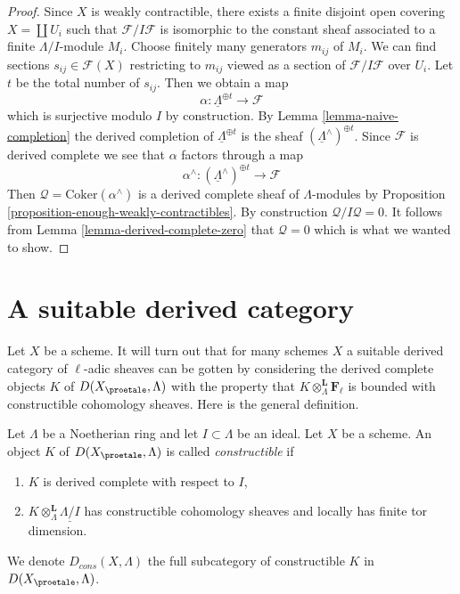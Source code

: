 \begin{proof}
Since $X$ is weakly contractible, there exists a finite disjoint open
covering $X = \coprod U_i$ such that $\mathcal{F}/I\mathcal{F}$
is isomorphic to the constant sheaf associated to a finite $\Lambda/I$-module
$M_i$. Choose finitely many generators $m_{ij}$ of $M_i$. We
can find sections $s_{ij} \in \mathcal{F}(X)$ restricting to
$m_{ij}$ viewed as a section of $\mathcal{F}/I\mathcal{F}$ over $U_i$. 
Let $t$ be the total number of $s_{ij}$. Then we obtain a map
$$
\alpha : \underline{\Lambda}^{\oplus t} \longrightarrow \mathcal{F}
$$
which is surjective modulo $I$ by construction. By
Lemma \ref{lemma-naive-completion}
the derived completion of $\underline{\Lambda}^{\oplus t}$ is the
sheaf $(\underline{\Lambda}^\wedge)^{\oplus t}$. Since $\mathcal{F}$
is derived complete we see that $\alpha$ factors through a map
$$
\alpha^\wedge :
(\underline{\Lambda}^\wedge)^{\oplus t}
\longrightarrow
\mathcal{F}
$$
Then $\mathcal{Q} = \text{Coker}(\alpha^\wedge)$ is a derived complete
sheaf of $\Lambda$-modules by
Proposition \ref{proposition-enough-weakly-contractibles}.
By construction $\mathcal{Q}/I\mathcal{Q} = 0$. It follows from
Lemma \ref{lemma-derived-complete-zero}
that $\mathcal{Q} = 0$ which is what we wanted to show.
\end{proof}








\section{A suitable derived category}
\label{section-suitable-derived}

\noindent
Let $X$ be a scheme. It will turn out that for many schemes $X$ a suitable
derived category of $\ell$-adic sheaves can be gotten by considering the
derived complete objects $K$ of $D(X_\proetale, \Lambda)$ with the property
that $K \otimes_\Lambda^\mathbf{L} \mathbf{F}_\ell$ is bounded with
constructible cohomology sheaves. Here is the general definition.

\begin{definition}
\label{definition-Dbc}
Let $\Lambda$ be a Noetherian ring and let $I \subset \Lambda$ be an ideal.
Let $X$ be a scheme. An object $K$ of $D(X_\proetale, \Lambda)$ is called
{\it constructible} if
\begin{enumerate}
\item $K$ is derived complete with respect to $I$,
\item $K \otimes_\Lambda^\mathbf{L} \underline{\Lambda/I}$
has constructible cohomology sheaves and locally has finite tor dimension.
\end{enumerate}
We denote $D_{cons}(X, \Lambda)$ the full subcategory of constructible
$K$ in $D(X_\proetale, \Lambda)$.
\end{definition}

